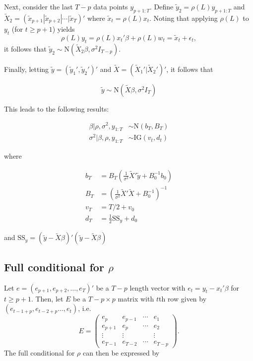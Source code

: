\documentclass{article}
\begin{document}
Next, consider the last $T - p$ data points $y_{p+1:T}$. Define $\tilde{y}_2 = \rho(L)y_{p+1:T}$ and $\tilde{X}_2 = (\tilde{x}_{p+1}|\tilde{x}_{p+2}|\cdots|\tilde{x}_T)'$ where $\tilde{x}_t = \rho(L)x_t$. Noting that applying $\rho(L)$ to $y_t$ (for $t \ge p+1$) yields \[\rho(L)y_t = \rho(L)x_t'\beta + \rho(L)w_t = \tilde{x}_t + \epsilon_t,\] it follows that $\tilde{y}_2 \sim \mbox{N}(\tilde{X}_2\beta, \sigma^2I_{T-p})$.

Finally, letting $\tilde{y} = (\tilde{y}_1',\tilde{y}_2')'$ and $\tilde{X} = (\tilde{X}_1'|\tilde{X}_2')'$, it follows that

\begin{equation}
\tilde{y} \sim \mbox{N}(\tilde{X}\beta,\sigma^2I_T) \label{eqn:tilde}
\end{equation}

\noindent This leads to the following results:

\begin{align}
\beta | \rho, \sigma^2, y_{1:T} &\sim \mbox{N}(b_T,B_T) \label{eqn:fullcondbeta} \\
\sigma^2 | \beta, \rho, y_{1:T} &\sim \mbox{IG}(v_t,d_t) \label{eqn:fullcondsigma2s}
\end{align}

\noindent where

\begin{align*}
b_T &= B_T(\frac{1}{\sigma^2}\tilde{X}'\tilde{y} + B_0^{-1}b_0) \\
B_T &= (\frac{1}{\sigma^2}\tilde{X}'\tilde{X} + B_0^{-1})^{-1} \\
v_T &= T/2 + v_0 \\
d_T &= \frac{1}{2}\mbox{SS}_y + d_0
\end{align*}

\noindent and $\mbox{SS}_y = (\tilde{y} - \tilde{X}\beta)'(\tilde{y} - \tilde{X}\beta)$

\subsection{Full conditional for $\rho$}

Let $e = (e_{p+1},e_{p+2},\ldots,e_T)'$ be a $T-p$ length vector with $e_t = y_t - x_t'\beta$ for $t \ge p+1$. Then, let $E$ be a $T-p \times p$ matrix with $t$th row given by $(e_{t-1+p},e_{t-2+p}\ldots,e_t)$, i.e. \[E = \left(\begin{array}{cccc}
e_p & e_{p-1} & \cdots & e_1 \\
e_{p+1} & e_p & \cdots & e_2 \\
\vdots & \vdots & & \vdots \\
e_{T-1} & e_{T-2} & \cdots & e_{T-p}
\end{array}\right).\] The full conditional for $\rho$ can then be expressed by
\end{document}
